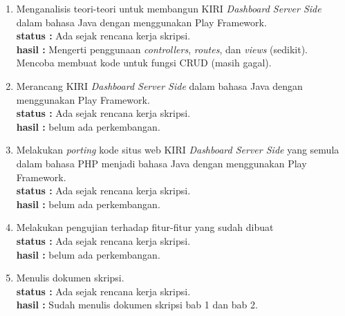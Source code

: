 \documentclass[a4paper,twoside]{article}
\begin{document}
\begin{enumerate}
		\item Menganalisis teori-teori untuk membangun KIRI \textit{Dashboard Server Side} dalam bahasa Java dengan menggunakan Play Framework.\\
		{\bf status :} Ada sejak rencana kerja skripsi.\\
		{\bf hasil :} Mengerti penggunaan \textit{controllers}, \textit{routes}, dan \textit{views} (sedikit). Mencoba membuat kode untuk fungsi CRUD (masih gagal).

		\item Merancang KIRI \textit{Dashboard Server Side} dalam bahasa Java dengan menggunakan Play Framework.\\
		{\bf status :} Ada sejak rencana kerja skripsi.\\
		{\bf hasil :} belum ada perkembangan.

		\item Melakukan \textit{porting} kode situs web KIRI \textit{Dashboard Server Side} yang semula dalam bahasa PHP menjadi bahasa Java dengan menggunakan Play Framework.\\
		{\bf status :} Ada sejak rencana kerja skripsi.\\
		{\bf hasil :} belum ada perkembangan.
		
		\item Melakukan pengujian terhadap fitur-fitur yang sudah dibuat\\
		{\bf status :} Ada sejak rencana kerja skripsi.\\
		{\bf hasil :} belum ada perkembangan.

		\item Menulis dokumen skripsi.\\
		{\bf status :} Ada sejak rencana kerja skripsi.\\
		{\bf hasil :} Sudah menulis dokumen skripsi bab 1 dan bab 2.
	\end{enumerate}
\end{document}
